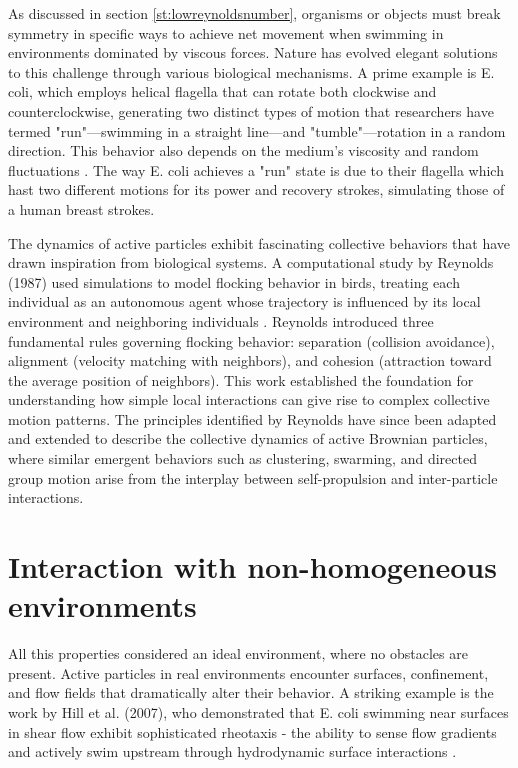 As discussed in section \ref{st:lowreynoldsnumber}, organisms or objects must break symmetry in specific ways to achieve net movement when swimming in environments dominated by viscous forces. Nature has evolved elegant solutions to this challenge through various biological mechanisms. A prime example is E. coli, which employs helical flagella that can rotate both clockwise and counterclockwise, generating two distinct types of motion that researchers have termed "run"—swimming in a straight line—and "tumble"—rotation in a random direction. This behavior also depends on the medium's viscosity and random fluctuations \cite{kumar2010physics}. The way E. coli achieves a "run" state is due to their flagella which hast two different motions for its power and recovery strokes, simulating those of a human breast strokes. 

The dynamics of active particles exhibit fascinating collective behaviors that have drawn inspiration from biological systems. A computational study by Reynolds (1987) used simulations to model flocking behavior in birds, treating each individual as an autonomous agent whose trajectory is influenced by its local environment and neighboring individuals \cite{reynolds1987flocks}. Reynolds introduced three fundamental rules governing flocking behavior: separation (collision avoidance), alignment (velocity matching with neighbors), and cohesion (attraction toward the average position of neighbors). This work established the foundation for understanding how simple local interactions can give rise to complex collective motion patterns. The principles identified by Reynolds have since been adapted and extended to describe the collective dynamics of active Brownian particles, where similar emergent behaviors such as clustering, swarming, and directed group motion arise from the interplay between self-propulsion and inter-particle interactions.

\section{Interaction with non-homogeneous environments}

All this properties considered an ideal environment, where no obstacles are present. Active particles in real environments encounter surfaces, confinement, and flow fields that dramatically alter their behavior. A striking example is the work by Hill et al. (2007), who demonstrated that E. coli swimming near surfaces in shear flow exhibit sophisticated rheotaxis - the ability to sense flow gradients and actively swim upstream through hydrodynamic surface interactions \cite{hill2007hydrodynamic}. 

